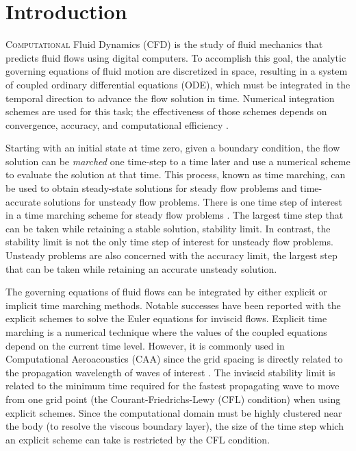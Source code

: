 \documentclass[conf]{new-aiaa}
\begin{document}
\section{Introduction}
\label{sec:Introdtion}
\lettrine{C}{omputational} Fluid Dynamics (CFD) is the study of fluid mechanics that predicts fluid flows using digital computers. 
To accomplish this goal, the analytic governing equations of fluid motion are discretized in space, resulting in a system of coupled ordinary differential equations (ODE), which must be integrated in the temporal direction to advance the flow solution in time. 
Numerical integration schemes are used for this task; the effectiveness of those schemes depends on convergence, accuracy, and computational efficiency \cite{Williamson}.

Starting with an initial state at time zero, given a boundary condition, the flow solution can be \textit{marched} one time-step to a time later and use a numerical scheme to evaluate the solution at that time.
This process, known as time marching, can be used to obtain steady-state solutions for steady flow problems and time-accurate solutions for unsteady flow problems.
There is one time step of interest in a time marching scheme for steady flow problems \cite{Pulliamm}. 
The largest time step that can be taken while retaining a stable solution, stability limit.
In contrast, the stability limit is not the only time step of interest for unsteady flow problems. 
Unsteady problems are also concerned with the accuracy limit, the largest step that can be taken while retaining an accurate unsteady solution.

The governing equations of fluid flows can be integrated by either explicit or implicit time marching methods. 
Notable successes have been reported with the explicit schemes to solve the Euler equations for inviscid flows. 
Explicit time marching is a numerical technique where the values of the coupled equations depend on the current time level. 
However, it is commonly used in Computational Aeroacoustics (CAA) since the grid spacing is directly related to the propagation wavelength of waves of interest \cite{YoonLUSGS}. 
The inviscid stability limit is related to the minimum time required for the fastest propagating wave to move from one grid point (the Courant-Friedrichs-Lewy (CFL) condition) when using explicit schemes. 
Since the computational domain must be highly clustered near the body (to resolve the viscous boundary layer), the size of the time step which an explicit scheme can take is restricted by the CFL condition.
\end{document}

